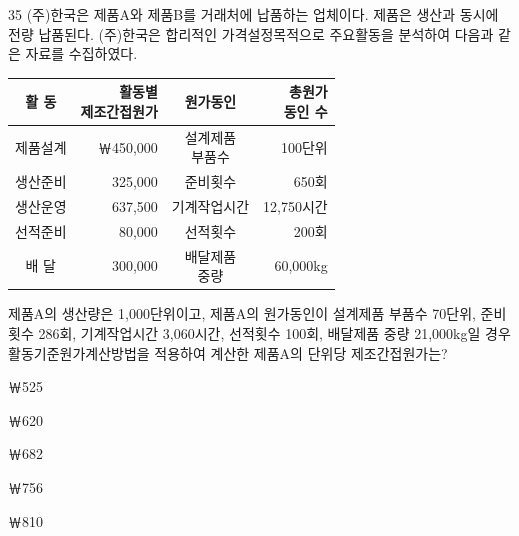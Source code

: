 \begin{question}{35}
(주)한국은 제품A와 제품B를 거래처에 납품하는 업체이다. 제품은 생산과 동시에 전량 납품된다.
(주)한국은 합리적인 가격설정목적으로 주요활동을 분석하여 다음과 같은 자료를 수집하였다. \begin{center}
\small
\begin{tabular}{|c|r|c|r|}
\hline
활 동 & \makecell{활동별\\제조간접원가} & 원가동인 & \makecell{총원가\\동인 수} \\
\hline
제품설계 & ￦450,000 & \makecell{설계제품\\부품수} & 100단위 \\
\hline
생산준비 & 325,000 & 준비횟수 & 650회 \\
\hline
생산운영 & 637,500 & 기계작업시간 & 12,750시간 \\
\hline
선적준비 & 80,000 & 선적횟수 & 200회 \\
\hline
배 달 & 300,000 & \makecell{배달제품\\중량} & 60,000kg \\
\hline
\end{tabular}
\end{center}
제품A의 생산량은 1,000단위이고, 제품A의 원가동인이 설계제품 부품수 70단위, 준비횟수 286회, 기계작업시간 3,060시간, 선적횟수 100회, 배달제품 중량 21,000kg일 경우 활동기준원가계산방법을 적용하여 계산한 제품A의 단위당 제조간접원가는? \par
\begin{choices}
  \item ￦525
  \item ￦620
  \item ￦682
  \item ￦756
  \item ￦810
\end{choices}
\end{question}
